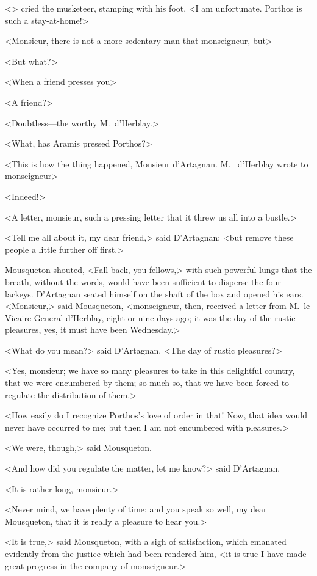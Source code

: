 <> cried the musketeer, stamping with his foot, <I am unfortunate. Porthos is such a stay-at-home!>

<Monsieur, there is not a more sedentary man that monseigneur, but\longdash>

<But what?>

<When a friend presses you\longdash>

<A friend?>

<Doubtless—the worthy M.~d'Herblay.>

<What, has Aramis pressed Porthos?>

<This is how the thing happened, Monsieur d'Artagnan. M.~ d'Herblay wrote to monseigneur\longdash>

<Indeed!>

<A letter, monsieur, such a pressing letter that it threw us all into a bustle.>

<Tell me all about it, my dear friend,> said D'Artagnan; <but remove these people a little further off first.>

Mousqueton shouted, <Fall back, you fellows,> with such powerful lungs that the breath, without the words, would have been sufficient to disperse the four lackeys. D'Artagnan seated himself on the shaft of the box and opened his ears. <Monsieur,> said Mousqueton, <monseigneur, then, received a letter from M.~le Vicaire-General d'Herblay, eight or nine days ago; it was the day of the rustic pleasures, yes, it must have been Wednesday.>

<What do you mean?> said D'Artagnan. <The day of rustic pleasures?>

<Yes, monsieur; we have so many pleasures to take in this delightful country, that we were encumbered by them; so much so, that we have been forced to regulate the distribution of them.>

<How easily do I recognize Porthos's love of order in that! Now, that idea would never have occurred to me; but then I am not encumbered with pleasures.>

<We were, though,> said Mousqueton.

<And how did you regulate the matter, let me know?> said D'Artagnan.

<It is rather long, monsieur.>

<Never mind, we have plenty of time; and you speak so well, my dear Mousqueton, that it is really a pleasure to hear you.>

<It is true,> said Mousqueton, with a sigh of satisfaction, which emanated evidently from the justice which had been rendered him, <it is true I have made great progress in the company of monseigneur.>


